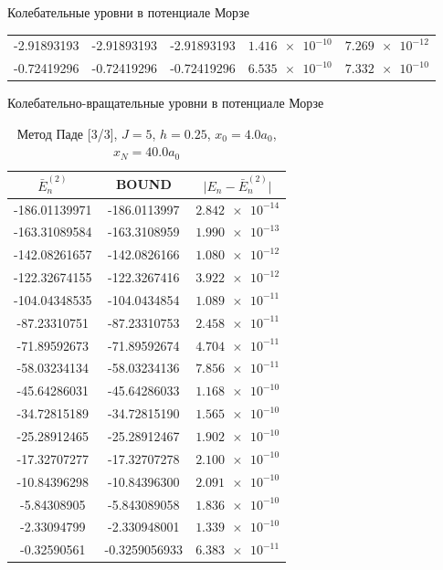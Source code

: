 \documentclass[10pt,pdf,hyperref={unicode},xcolor=dvipsnames]{beamer}
\begin{document}
\begin{frame}{Колебательные уровни в потенциале Морзе}
\begin{block}{}
\begin{table}[H]
\begin{tabular}{ccccc}
                -2.91893193   & -2.91893193   & -2.91893193 & $\num{1.416e-10}$ & $\num{7.269e-12}$ \\
                -0.72419296   & -0.72419296   & -0.72419296 & $\num{6.535e-10}$ & $\num{7.332e-10}$ \\
            \bottomrule                        
            \end{tabular}                      
        \end{table}                            
    \end{block}                                
\end{frame}                                    

\begin{frame}{Колебательно-вращательные уровни в потенциале Морзе}
    \begin{block}{}
        \begin{table}[H]
            \vspace*{-0.75cm}
            \caption{Метод Паде [3/3], $J = 5$, $h = 0.25$, $x_0 = 4.0 a_0$, $x_N = 40.0 a_0$}
            \vspace*{-0.25cm}
            \begin{tabular}{ccc}
                \toprule
                $\bar{E}_n^{(2)}$ & BOUND & $\vert E_n - \bar{E}_n^{(2)} \vert$ \\
                \midrule
 -186.01139971 & -186.0113997   &  $\num{2.842e-14}$ \\  
 -163.31089584 & -163.3108959   &  $\num{1.990e-13}$ \\
 -142.08261657 & -142.0826166   &  $\num{1.080e-12}$ \\
 -122.32674155 & -122.3267416   &  $\num{3.922e-12}$ \\
 -104.04348535 & -104.0434854   &  $\num{1.089e-11}$ \\
 -87.23310751  & -87.23310753   &  $\num{2.458e-11}$ \\
 -71.89592673  & -71.89592674   &  $\num{4.704e-11}$ \\
 -58.03234134  & -58.03234136   &  $\num{7.856e-11}$ \\
 -45.64286031  & -45.64286033   &  $\num{1.168e-10}$ \\
 -34.72815189  & -34.72815190   &  $\num{1.565e-10}$ \\
 -25.28912465  & -25.28912467   &  $\num{1.902e-10}$ \\
 -17.32707277  & -17.32707278   &  $\num{2.100e-10}$ \\
 -10.84396298  & -10.84396300   &  $\num{2.091e-10}$ \\
 -5.84308905   & -5.843089058   &  $\num{1.836e-10}$ \\
 -2.33094799   & -2.330948001   &  $\num{1.339e-10}$ \\
 -0.32590561   & -0.3259056933  &  $\num{6.383e-11}$ \\
            \bottomrule
            \end{tabular}
        \end{table}
    \end{block}
\end{frame}
\end{document}
